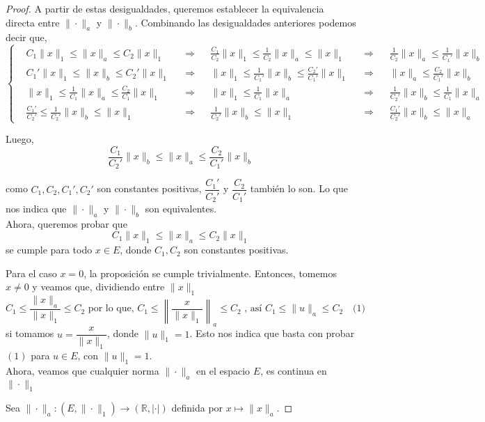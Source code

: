 \begin{enumerate}
\begin{proof}
A partir de estas desigualdades, queremos establecer la equivalencia directa entre $\|\cdot\|_a$ y $\|\cdot\|_b$. Combinando las desigualdades anteriores podemos decir que, 
\[
\left\{
\begin{aligned}
& C_1 \|x\|_1 \leq \|x\|_a \leq C_2 \|x\|_1 && \Rightarrow && \frac{C_1}{C_2} \|x\|_1 \leq \frac{1}{C_2} \|x\|_a \leq \|x\|_1 && \Rightarrow && \frac{1}{C_2} \|x\|_a \leq \frac{1}{C_1'} \|x\|_b \\
& C_1' \|x\|_1 \leq \|x\|_b \leq C_2' \|x\|_1 && \Rightarrow && \|x\|_1 \leq \frac{1}{C_1'} \|x\|_b \leq \frac{C_2'}{C_1'} \|x\|_1 && \Rightarrow && \|x\|_a \leq \frac{C_2}{C_1'} \|x\|_b \\
& \|x\|_1 \leq \frac{1}{C_1} \|x\|_a \leq \frac{C_2}{C_1} \|x\|_1 && \Rightarrow && \|x\|_1 \leq \frac{1}{C_1} \|x\|_a && \Rightarrow && \frac{1}{C_2'} \|x\|_b \leq \frac{1}{C_1} \|x\|_a \\
& \frac{C_1'}{C_2'} \leq \frac{1}{C_2'} \|x\|_b \leq \|x\|_1 && \Rightarrow && \frac{1}{C_2'} \|x\|_b \leq \|x\|_1 && \Rightarrow && \frac{C_1'}{C_2'} \|x\|_b \leq \|x\|_a
\end{aligned}
\right.
\]

Luego,
\[
\frac{C_1}{C_2'} \|x\|_b \leq \|x\|_a \leq \frac{C_2}{C_1'} \|x\|_b
\]

como \( C_1, C_2, C_1', C_2' \) son constantes positivas, \( \dfrac{C_1'}{C_2'} \) y \( \dfrac{C_2}{C_1'} \) también lo son. Lo que nos indica que \( \|\cdot\|_a \) y \( \|\cdot\|_b \) son equivalentes.\\

Ahora, queremos probar que 
\[
C_1 \|x\|_1 \leq \|x\|_a \leq C_2 \|x\|_1
\]
se cumple para todo $x \in E$, donde $C_1, C_2$ son constantes positivas. 

Para el caso $x = 0$, la proposición se cumple trivialmente. Entonces, tomemos $x \neq 0$ y veamos que, dividiendo entre $\|x\|_1$
\[
C_1 \leq \frac{\|x\|_a}{\|x\|_1} \leq C_2 
\text{ por lo que, }
C_1 \leq \left\|\frac{x}{\|x\|_1}\right\|_a \leq C_2 
\text{ , así  } 
C_1 \leq \|u\|_a \leq C_2 \quad \text{(1)}
\]
si tomamos $u = \dfrac{x}{\|x\|_1}$, donde $\|u\|_1 = 1$. Esto nos indica que basta con probar $(1)$ para $u \in E$, con $\|u\|_1 = 1$.\\

Ahora, veamos que cualquier norma $\|\cdot\|_a$ en el espacio $E$, es continua en $\|\cdot\|_1$

Sea $\|\cdot\|_a : (E, \|\cdot\|_1) \to (\mathbb{R}, |\cdot|)$ definida por $x \mapsto \|x\|_a$.


\end{proof}
\end{enumerate}
